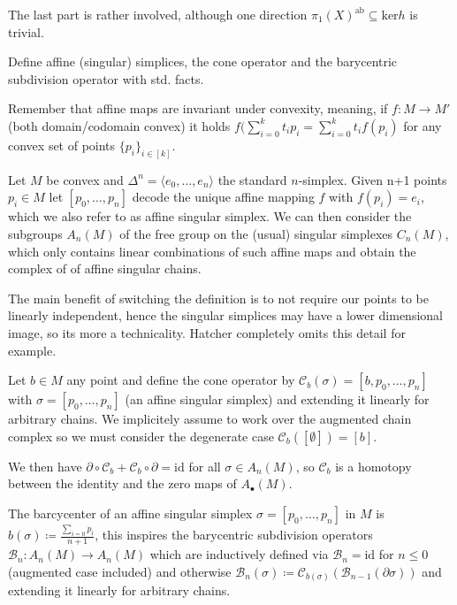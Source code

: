 The last part is rather involved, although one direction \( \pi_1(X)^{\text{ab}} \subseteq \text{ker} h\) is trivial.


Define affine (singular) simplices, the cone operator and the barycentric subdivision operator
with std. facts.

Remember that affine maps are invariant under convexity, meaning, if \(f : M \to M'\) (both domain/codomain convex)
it holds \( f(\sum_{i=0}^k t_i p_i  = \sum_{i=0}^k t_if(p_i) \) for any convex set of points \( \{p_i\}_{i \in [k]} \).

Let \( M \) be convex and \( \Delta^n = \langle e_0, \dots, e_n \rangle\) the standard \( n \)-simplex.
Given n+1 points \(p_i \in M\) let \( [p_0, \dots, p_n] \) decode the unique affine mapping \( f \) with \( f(p_i) = e_i \),
which we also refer to as affine singular simplex.
We can then consider the subgroups \( A_n(M) \) of the free group on the (usual) singular simplexes \( C_n(M) \), which only contains
linear combinations of such affine maps and obtain the complex of of affine singular chains.

The main benefit of switching the definition is to not require our points to be linearly independent, hence the singular simplices may have a lower dimensional image,
so its more a technicality. Hatcher completely omits this detail for example.

Let \( b \in M \) any point
and define the cone operator by \( \mathcal{C}_b(\sigma) = [b, p_0, \dots, p_n] \) with \( \sigma = [p_0, \dots, p_n] \) (an affine singular simplex)
and extending it linearly for arbitrary chains.
We implicitely assume to work over the augmented chain complex so we must consider the degenerate case \( \mathcal{C}_b([\emptyset]) = [b] \).

We then have 
\( \partial \circ \mathcal{C}_b + \mathcal{C}_b \circ \partial = \text{id} \)
for all \( \sigma \in A_n(M) \), so \( \mathcal{C}_b \) is a homotopy between the identity and the zero maps of \( A_\bullet(M) \).


The barcycenter of an affine singular simplex \( \sigma = [p_0, \dots, p_n] \) in \( M \) is \( b(\sigma) \coloneqq \frac{\sum_{i=0} p_i}{n+1} \),
this inspires the barycentric subdivision operators \( \mathcal{B}_n : A_n(M) \to A_n(M) \) which are inductively defined via \( \mathcal{B}_n = \text{id} \)
for \( n \leq 0 \) (augmented case included) and otherwise \( \mathcal{B}_n(\sigma) \coloneqq \mathcal{C}_{b(\sigma)}(\mathcal{B}_{n-1}(\partial \sigma)) \)
and extending it linearly for arbitrary chains.

